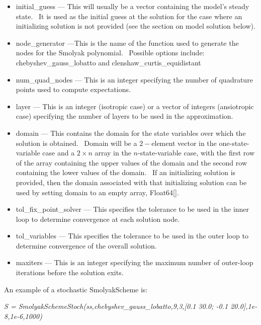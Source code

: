 \documentclass[notitlepage,11pt]{article}
\begin{document}
\begin{itemize}
\item initial\_guess --- This will usually be a vector containing the
model's steady state. \ It is used as the initial guess at the solution for
the case where an initializing solution is not provided (see the section on
model solution below).

\item node\_generator ---This is the name of the function used to generate
the nodes for the Smolyak polynomial. \ Possible options include:
chebyshev\_gauss\_lobatto and clenshaw\_curtis\_equidistant

\item num\_quad\_nodes --- This is an integer specifying the number of
quadrature points used to compute expectations.

\item layer --- This is an integer (isotropic case) or a vector of integers
(ansiotropic case) specifying the number of layers to be used in the
approximation.

\item domain --- This contains the domain for the state variables over which
the solution is obtained. \ Domain will be a $2-$element vector in the
one-state-variable case and a $2\times n$ array in the $n$-state-variable
case, with the first row of the array containing the upper values of the
domain and the second row containing the lower values of the domain. \ If an
initializing solution is provided, then the domain associated with that
initializing solution can be used by setting domain to an empty array,
Float64[].

\item tol\_fix\_point\_solver --- This specifies the tolerance to be used in
the inner loop to determine convergence at each solution node.

\item tol\_variables --- This specifies the tolerance to be used in the
outer loop to determine convergence of the overall solution.

\item maxiters --- This is an integer specifying the maximum number of
outer-loop iterations before the solution exits.
\end{itemize}

\bigskip

An example of a stochastic SmolyakScheme is:

\bigskip

\textit{S = SmolyakSchemeStoch(ss,chebyshev\_gauss\_lobatto,9,3,[0.1 30.0;
-0.1 20.0],1e-8,1e-6,1000)}
\end{document}
